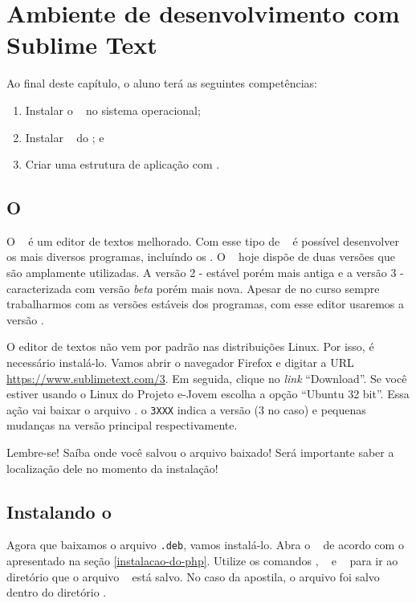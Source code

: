 \chapter{Ambiente de desenvolvimento com Sublime Text}

Ao final deste capítulo, o aluno terá as seguintes competências:
\begin{enumerate}
	\item Instalar o \sublime \sublimeversao~ no sistema operacional;
	\item Instalar \plugins~ do \sublime; e
	\item Criar uma estrutura de aplicação \web com \php. 
\end{enumerate}

\section{O \sublime}
\label{o-sublime}

O \sublime~ é um editor de textos melhorado. Com esse tipo de \software~
é possível desenvolver os mais diversos programas, incluíndo os \sites. 
O \sublime~ hoje dispõe de duas versões que são amplamente utilizadas. 
A versão 2 - estável porém mais antiga e a versão 3 - caracterizada com 
versão \textit{beta} porém mais nova. Apesar de no curso sempre trabalharmos com 
as versões estáveis dos programas, com esse editor usaremos a versão \sublimeversao.

O editor de textos não vem por padrão nas distribuições Linux. Por isso, é necessário instalá-lo. 
Vamos abrir o navegador Firefox e digitar a URL \url{https://www.sublimetext.com/3}.
Em seguida, clique no \textit{link} ``Download''. Se você estiver usando o Linux do Projeto e-Jovem
escolha a opção ``Ubuntu 32 bit''. Essa ação vai baixar o arquivo \sublimefilename.
o \texttt{3XXX} indica a versão (3 no caso) e pequenas mudanças na versão principal respectivamente.

Lembre-se! Saíba onde você salvou o arquivo baixado! Será importante saber a localização dele
no momento da instalação!

\section{Instalando o \sublime}
\label{instalando-o-sublime}

Agora que baixamos o arquivo \texttt{.deb}, vamos instalá-lo. Abra o \terminal~ de acordo
com o apresentado na seção \ref{instalacao-do-php}. Utilize os comandos \comandocdcompleto, 
\comandolscompleto~ e \comandopwdcompleto~ para ir ao diretório que o arquivo \sublimefilename~ está salvo.
No caso da apostila, o arquivo foi salvo dentro do diretório .

